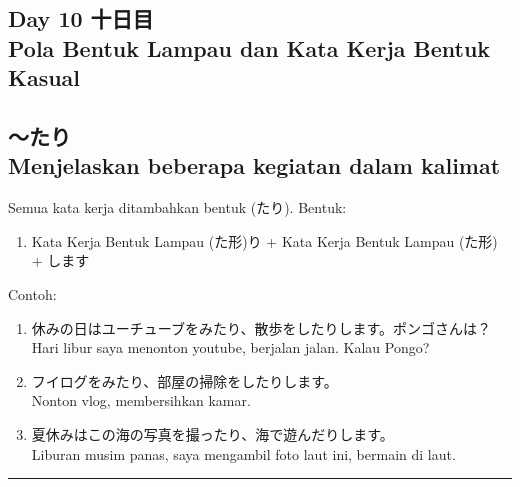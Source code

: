 \begin{flushright}
    \section*{\Large{Day 10 十日目 \\
    Pola Bentuk Lampau dan Kata Kerja Bentuk Kasual}}
\end{flushright}

\subsection*{
    ～たり \\ 
    Menjelaskan beberapa kegiatan dalam kalimat
}
Semua kata kerja ditambahkan bentuk (たり).
Bentuk:
\begin{enumerate}
    \item Kata Kerja Bentuk Lampau (た形)り + 
    Kata Kerja Bentuk Lampau (た形) + します
\end{enumerate}
Contoh: 
\begin{enumerate}
    \item 休みの日はユーチューブをみたり、散歩をしたりします。ポンゴさんは？
    \\ Hari libur saya menonton youtube, berjalan jalan. Kalau Pongo?
    \item フイログをみたり、部屋の掃除をしたりします。
    \\ Nonton vlog, membersihkan kamar.
    \item 夏休みはこの海の写真を撮ったり、海で遊んだりします。
    \\ Liburan musim panas, saya mengambil foto laut ini, bermain di laut.
\end{enumerate}

\vspace{0.2cm}\hrule height 1pt\vspace{0.2cm}


